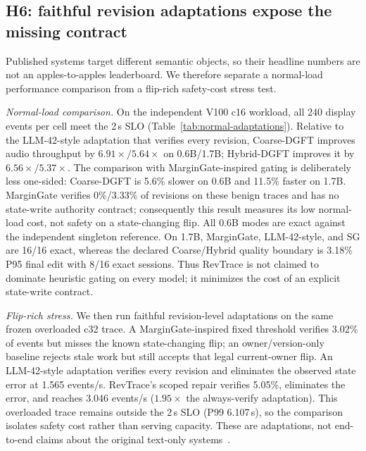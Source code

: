 \subsection{H6: faithful revision adaptations expose the missing contract}
\label{sec:eval:h6}

Published systems target different semantic objects, so their headline
numbers are not an apples-to-apples leaderboard. We therefore separate a
normal-load performance comparison from a flip-rich safety-cost stress test.

\emph{Normal-load comparison.} On the independent V100 c16 workload, all
240 display events per cell meet the 2\,s SLO
(Table~\ref{tab:normal-adaptations}). Relative to the LLM-42-style adaptation
that verifies every revision, Coarse-DGFT improves audio throughput by
$6.91\times/5.64\times$ on 0.6B/1.7B; Hybrid-DGFT improves it by
$6.56\times/5.37\times$. The comparison with MarginGate-inspired gating is
deliberately less one-sided: Coarse-DGFT is 5.6\% slower on 0.6B and 11.5\%
faster on 1.7B. MarginGate verifies 0\%/3.33\% of revisions on these benign
traces and has no state-write authority contract; consequently this result
measures its low normal-load cost, not safety on a state-changing flip. All
0.6B modes are exact against the independent singleton reference. On 1.7B,
MarginGate, LLM-42-style, and SG are 16/16 exact, whereas the declared
Coarse/Hybrid quality boundary is 3.18\% P95 final edit with 8/16 exact
sessions. Thus RevTrace is not claimed to dominate heuristic gating on every
model; it minimizes the cost of an explicit state-write contract.


\emph{Flip-rich stress.} We then run faithful revision-level adaptations on
the same frozen overloaded c32 trace. A MarginGate-inspired fixed threshold
verifies 3.02\% of events but misses the known state-changing flip; an
owner/version-only baseline rejects stale work but still accepts that legal
current-owner flip. An LLM-42-style adaptation verifies every revision and
eliminates the observed state error at 1.565 events/s. RevTrace's scoped
repair verifies 5.05\%, eliminates the error, and reaches 3.046 events/s
($1.95\times$ the always-verify adaptation). This overloaded trace remains
outside the 2\,s SLO (P99 6.107\,s), so the comparison isolates safety cost
rather than serving capacity. These are adaptations, not end-to-end claims
about the original text-only systems~\cite{chu2026margingate,zhang2026llm42}.

